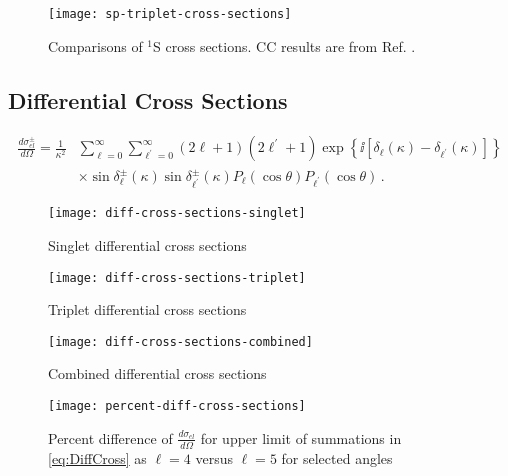 \documentclass[Dissertation.tex]{subfiles}
\begin{document}
\begin{figure}[H]
	\centering
	\texttt{[image: sp-triplet-cross-sections]}
	\caption[Comparisons of $^1$S cross sections.]{Comparisons of $^1$S cross sections. CC results are from Ref. \cite{Walters2004}.}
	\label{fig:sp-triplet-cross-sections}
\end{figure}


\subsection{Differential Cross Sections}
\label{sec:diffcross}

\begin{align}
\label{eq:DiffCross}
\nonumber \frac{d\sigma_{el}^\pm}{d\Omega} = \frac{1}{\kappa^2} & \sum_{\ell=0}^\infty \sum_{\ell^\prime=0}^\infty (2\ell+1)(2\ell^\prime+1) \exp\left\{\ii \left[\delta_\ell(\kappa) - \delta_{\ell^\prime}(\kappa) \right] \right\} \\
& \times \sin\delta_\ell^\pm(\kappa) \sin\delta_{\ell^\prime}^\pm(\kappa) P_\ell(\cos\theta) P_{\ell^\prime}(\cos\theta)\,.
\end{align}

\begin{figure}[H]
	\centering
	\texttt{[image: diff-cross-sections-singlet]}
	\caption{Singlet differential cross sections}
	\label{fig:diff-cross-sections-singlet}
\end{figure}

\begin{figure}[H]
	\centering
	\texttt{[image: diff-cross-sections-triplet]}
	\caption{Triplet differential cross sections}
	\label{fig:diff-cross-sections-triplet}
\end{figure}

\begin{figure}[H]
	\centering
	\texttt{[image: diff-cross-sections-combined]}
	\caption{Combined differential cross sections}
	\label{fig:diff-cross-sections-combined}
\end{figure}

\begin{figure}[H]
	\centering
	\texttt{[image: percent-diff-cross-sections]}
	\caption[Percent difference of differential cross sections at selected angles]{Percent difference of $\frac{d\sigma_{el}}{d\Omega}$ for upper limit of summations in \ref{eq:DiffCross} as $\ell = 4$ versus $\ell = 5$ for selected angles}
	\label{fig:percent-diff-cross-sections}
\end{figure}
\end{document}
